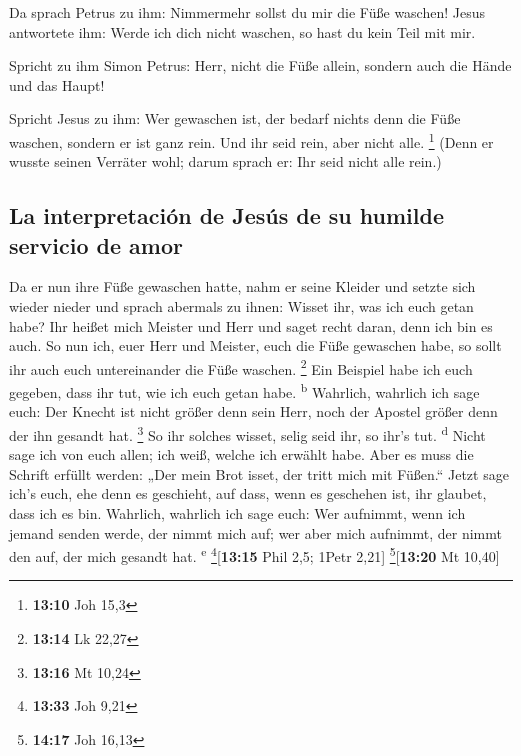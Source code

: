  Da sprach Petrus zu ihm: Nimmermehr sollst du mir die
Füße waschen! Jesus antwortete ihm: Werde ich dich nicht waschen, so
hast du kein Teil mit mir.

 Spricht zu ihm Simon Petrus: Herr, nicht die Füße allein,
sondern auch die Hände und das Haupt!

 Spricht Jesus zu ihm: Wer gewaschen ist, der bedarf
nichts denn die Füße waschen, sondern er ist ganz rein. Und ihr seid
rein, aber nicht alle. \footnote{\textbf{13:10} Joh 15,3}
 (Denn er wusste seinen Verräter wohl; darum sprach er:
Ihr seid nicht alle rein.)

\hypertarget{la-interpretaciuxf3n-de-jesuxfas-de-su-humilde-servicio-de-amor}{%
\subsection{La interpretación de Jesús de su humilde servicio de
amor}\label{la-interpretaciuxf3n-de-jesuxfas-de-su-humilde-servicio-de-amor}}

 Da er nun ihre Füße gewaschen hatte, nahm er seine
Kleider und setzte sich wieder nieder und sprach abermals zu ihnen:
Wisset ihr, was ich euch getan habe?  Ihr heißet mich
Meister und Herr und saget recht daran, denn ich bin es auch.
 So nun ich, euer Herr und Meister, euch die Füße
gewaschen habe, so sollt ihr auch euch untereinander die Füße waschen.
\footnote{\textbf{13:14} Lk 22,27}  Ein Beispiel habe ich
euch gegeben, dass ihr tut, wie ich euch getan habe. \textsuperscript{b}
 Wahrlich, wahrlich ich sage euch: Der Knecht ist nicht
größer denn sein Herr, noch der Apostel größer denn der ihn gesandt hat.
\footnote{\textbf{13:16} Mt 10,24}  So ihr solches
wisset, selig seid ihr, so ihr's tut. \textsuperscript{d}
 Nicht sage ich von euch allen; ich weiß, welche ich
erwählt habe. Aber es muss die Schrift erfüllt werden: „Der mein Brot
isset, der tritt mich mit Füßen.``  Jetzt sage ich's
euch, ehe denn es geschieht, auf dass, wenn es geschehen ist, ihr
glaubet, dass ich es bin.  Wahrlich, wahrlich ich sage
euch: Wer aufnimmt, wenn ich jemand senden werde, der nimmt mich auf;
wer aber mich aufnimmt, der nimmt den auf, der mich gesandt hat.
\textsuperscript{e} \footnote{\textbf{13:33} Joh 9,21}{[}\textbf{13:15}
Phil 2,5; 1Petr 2,21{]} \footnote{\textbf{14:17} Joh 16,13}{[}\textbf{13:20}
Mt 10,40{]}

